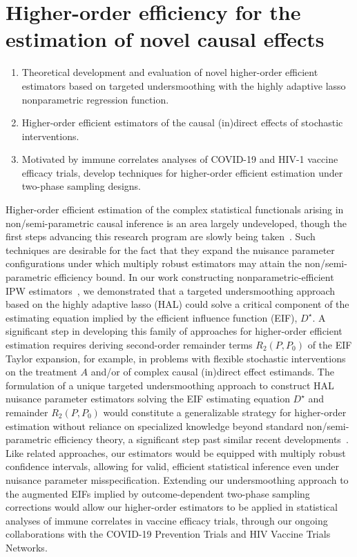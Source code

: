 \section{Higher-order efficiency for the estimation of novel causal effects}

\begin{enumerate}[label=(\alph*)]
  \itemsep0.2pt
  \item Theoretical development and evaluation of novel higher-order efficient
    estimators based on targeted undersmoothing with the highly adaptive lasso
    nonparametric regression function.
  \item Higher-order efficient estimators of the causal (in)direct effects of
    stochastic interventions.
  \item Motivated by immune correlates analyses of COVID-19 and HIV-1 vaccine
    efficacy trials, develop techniques for higher-order efficient estimation
    under two-phase sampling designs.
\end{enumerate}

Higher-order efficient estimation of the complex statistical functionals arising
in non/semi-parametric causal inference is an area largely undeveloped, though
the first steps advancing this research program are slowly being
taken~\citep{robins2008higher,carone2018higher}. Such techniques are desirable
for the fact that they expand the nuisance parameter configurations under which
multiply robust estimators may attain the non/semi-parametric efficiency bound.
In our work constructing nonparametric-efficient IPW
estimators~\citep{ertefaie2020nonparametric}, we demonstrated that a targeted
undersmoothing approach based on the highly adaptive lasso (HAL) could solve
a critical component of the estimating equation implied by the efficient
influence function (EIF), $D^{\star}$. A significant step in developing this
family of approaches for higher-order efficient estimation requires deriving
second-order remainder terms $R_2(P, P_0)$ of the EIF Taylor expansion, for
example, in problems with flexible stochastic interventions on the treatment
$A$ and/or of complex causal (in)direct effect estimands. The formulation of
a unique targeted undersmoothing approach to construct HAL nuisance parameter
estimators solving the EIF estimating equation $D^{\star}$ and remainder
$R_2(P, P_0)$ would constitute a generalizable strategy for higher-order
estimation without reliance on specialized knowledge beyond standard
non/semi-parametric efficiency theory, a significant step past similar recent
developments~\citep{vdl2017generally, benkeser2017doubly}. Like related
approaches, our estimators would be equipped with multiply robust confidence
intervals, allowing for valid, efficient statistical inference even under
nuisance parameter misspecification. Extending our undersmoothing approach to
the augmented EIFs implied by outcome-dependent two-phase sampling corrections
would allow our higher-order estimators to be applied in statistical analyses of
immune correlates in vaccine efficacy trials, through our ongoing collaborations
with the COVID-19 Prevention Trials and HIV Vaccine Trials Networks.

